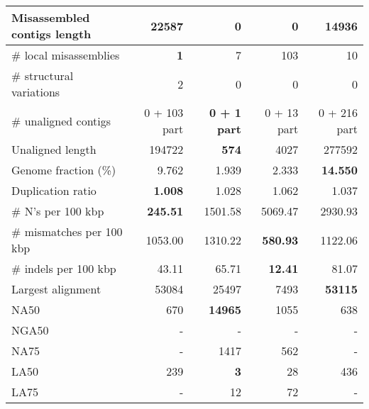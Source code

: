 \documentclass[12pt,a4paper]{article}
\begin{document}
\begin{table}[ht]
\begin{center}
\begin{tabular}{|l*{4}{|r}|}
Misassembled contigs length & 22587 & {\bf 0} & {\bf 0} & 14936 \\ \hline
\# local misassemblies & {\bf 1} & 7 & 103 & 10 \\ \hline
\# structural variations & 2 & 0 & 0 & 0 \\ \hline
\# unaligned contigs & 0 + 103 part & {\bf 0 + 1 part} & 0 + 13 part & 0 + 216 part \\ \hline
Unaligned length & 194722 & {\bf 574} & 4027 & 277592 \\ \hline
Genome fraction (\%) & 9.762 & 1.939 & 2.333 & {\bf 14.550} \\ \hline
Duplication ratio & {\bf 1.008} & 1.028 & 1.062 & 1.037 \\ \hline
\# N's per 100 kbp & {\bf 245.51} & 1501.58 & 5069.47 & 2930.93 \\ \hline
\# mismatches per 100 kbp & 1053.00 & 1310.22 & {\bf 580.93} & 1122.06 \\ \hline
\# indels per 100 kbp & 43.11 & 65.71 & {\bf 12.41} & 81.07 \\ \hline
Largest alignment & 53084 & 25497 & 7493 & {\bf 53115} \\ \hline
NA50 & 670 & {\bf 14965} & 1055 & 638 \\ \hline
NGA50 & - & - & - & - \\ \hline
NA75 & - & 1417 & 562 & - \\ \hline
LA50 & 239 & {\bf 3} & 28 & 436 \\ \hline
LA75 & - & 12 & 72 & - \\ \hline
\end{tabular}
\end{center}
\end{table}
\end{document}
